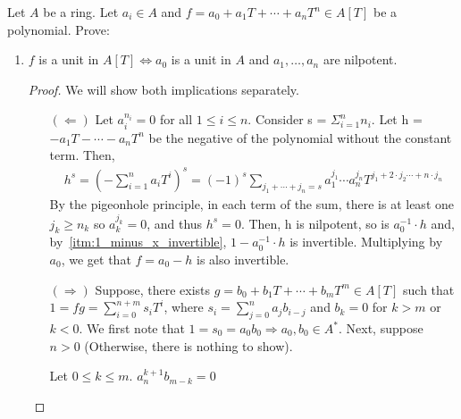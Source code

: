 \begin{problem}
    Let $A$ be a ring.
    Let $a_i\in A$ and $f = a_0 + a_1 T + \cdots + a_n T^n \in A[T]$ be a polynomial.
    Prove:
    \begin{enumerate}[label=(\theproblem.\arabic*),ref=\theproblem.\arabic*]

        \item \label{itm:coefficients_nilpotent}
        $f$ is a unit in $A[T] \iff a_0$ is a unit in $A$ and $a_1, \ldots, a_n$ are nilpotent.
            \begin{sol}
                \begin{proof}
                    We will show both implications separately.
                    \begin{itemize}
                        \item[$(\Leftarrow)$]
                        Let $a_i^{n_i} = 0$ for all $1 \leq i \leq n$.
                        Consider s = $\varSigma_{i=1}^{n} n_i$.
                        Let h = $-a_1 T - \cdots - a_n T^n$ be the negative of the polynomial without the constant term.
                        Then,
                            \begin{align*}
                                h^s = \left(- \sum_{i=1}^{n} a_i T^i \right)^s = (-1)^s \sum_{j_1 + \cdots + j_n = s} a_1^{j_1} \cdots a_n^{j_n} T^{j_1 + 2 \cdot j_2 \cdots + n \cdot j_n}
                            \end{align*}
                        By the pigeonhole principle, in each term of the sum, there is at least one $j_k \geq n_k$ so $a_k^{j_k} = 0$, and thus $h^s = 0$.
                        Then, h is nilpotent, so is $a_0^{-1} \cdot h$ and, by~\ref{itm:1_minus_x_invertible}, $1 - a_0^{-1} \cdot h$ is invertible.
                        Multiplying by $a_0$, we get that $f = a_0 - h$ is also invertible.
                        \item[$(\Rightarrow)$]
                        Suppose, there exists $g = b_0 + b_1 T + \cdots + b_m T^m \in A[T]$ such that $1 = fg = \sum_{i=0}^{n+m} s_i T^i$,
                        where $s_i =  \sum_{j=0}^{n} a_j b_{i-j}$ and $b_k = 0$ for $k>m$ or $k < 0$.
                        We first note that $1 = s_0 = a_0 b_0 \Rightarrow a_0, b_0 \in A^*$.
                        Next, suppose $n > 0$ (Otherwise, there is nothing to show).
                        \begin{claim}
                            Let $0 \leq k \leq m$. $a_n^{k + 1} b_{m-k} = 0$

\end{claim}
\end{itemize}
\end{proof}
\end{sol}
\end{enumerate}
\end{problem}
